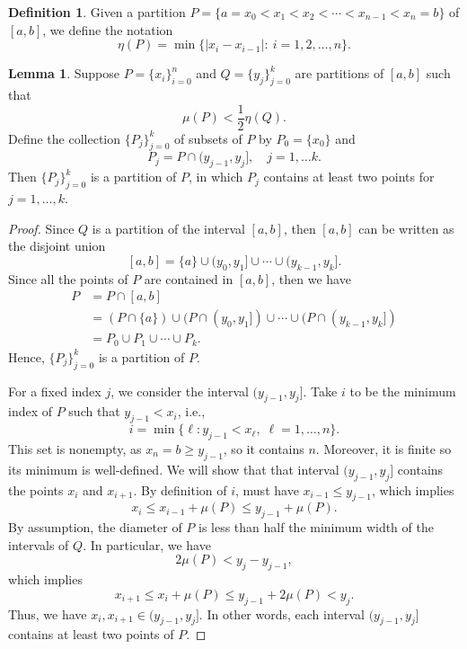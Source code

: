 \documentclass[12pt]{article}
\theoremstyle{definition}
\newtheorem{lemma}{Lemma}
\newtheorem{definition}{Definition}
\begin{document}
\begin{definition}
    Given a partition $P=\{a=x_0 < x_1 < x_2 < \cdots < x_{n-1} < x_n=b\}$ of $[a,b]$, we define the notation
    \[
        \eta(P) = \min \{ |x_i-x_{i-1}|:\ i=1,2,\ldots,n\}.
    \]
\end{definition}

\newpage
\begin{lemma}
    Suppose $P = \{x_i\}_{i=0}^n$ and $Q = \{y_j\}_{j=0}^k$ are partitions of $[a, b]$ such that
    \[
        \mu(P) < \frac12\eta(Q).
    \]
    Define the collection $\{P_j\}_{j=0}^k$ of subsets of $P$ by $P_0 = \{x_0\}$ and
    \[
        P_j = P \cap (y_{j-1}, y_j], \quad j = 1, \dots k.
    \]
    Then $\{P_j\}_{j=0}^k$ is a partition of $P$, in which $P_j$ contains at least two points for $j = 1, \dots, k$.
\end{lemma}

\begin{proof}
    Since $Q$ is a partition of the interval $[a, b]$, then $[a, b]$ can be written as the disjoint union
     \[
        [a, b] = \{a\} \cup (y_0, y_1] \cup \cdots \cup (y_{k-1}, y_k].
    \]
    Since all the points of $P$ are contained in $[a, b]$, then we have
    \begin{align*}
        P 
            &= P \cap [a, b] \\
            &= (P \cap \{a\}) \cup (P \cap (y_0, y_1]) \cup \cdots \cup (P \cap (y_{k-1}, y_k]) \\
            &= P_0 \cup P_1 \cup \cdots \cup P_k.
    \end{align*}
    Hence, $\{P_j\}_{j=0}^k$ is a partition of $P$.

    For a fixed index $j$, we consider the interval $(y_{j-1}, y_j]$. Take $i$ to be the minimum index of $P$ such that $y_{j-1} < x_i$, i.e.,
    \[
        i = \min\{\ell : y_{j - 1} < x_\ell,\; \ell = 1, \dots, n\}.
    \]
    This set is nonempty, as $x_n = b \geq y_{j-1}$, so it contains $n$. Moreover, it is finite so its minimum is well-defined. We will show that that interval $(y_{j-1}, y_j]$ contains the points $x_i$ and $x_{i+1}$. By definition of $i$, must have $x_{i-1} \leq y_{j-1}$, which implies
    \[
        x_i \leq x_{i-1} + \mu(P)  \leq y_{j-1} + \mu(P).
    \]
    By assumption, the diameter of $P$ is less than half the minimum width of the intervals of $Q$. In particular, we have
    \[
        2\mu(P) < y_j - y_{j-1},
    \]
    which implies
    \[
        x_{i+1} \leq x_i + \mu(P) \leq y_{j-1} + 2\mu(P) < y_j.
    \]
    Thus, we have $x_i, x_{i+1} \in (y_{j-1}, y_j]$. In other words, each interval $(y_{j-1}, y_j]$ contains at least two points of $P$.
    
\end{proof}
\end{document}
